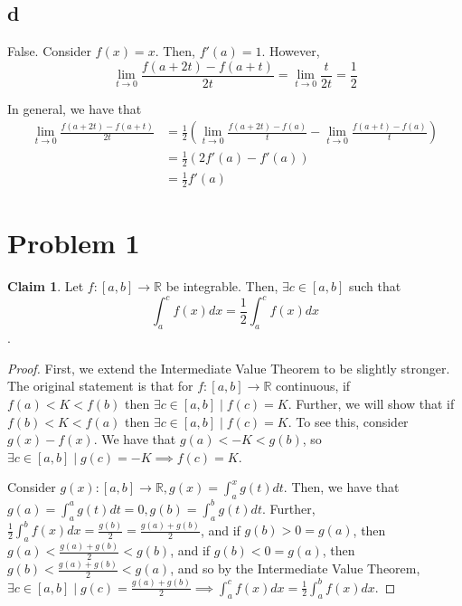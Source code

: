 \documentclass[12pt,letterpaper]{article}
\theoremstyle{definition}
\newtheorem*{claim}{Claim}
\newcommand{\R}{\mathbb{R}}
\begin{document}
\begin{proofof}
\subsection*{d}

False. Consider $f(x) = x$. Then, $f'(a) = 1$. However,
\[
  \lim_{t\rightarrow 0}\frac{f(a + 2t) - f(a+t)}{2t} = \lim_{t\rightarrow
    0}\frac{t}{2t} = \frac{1}{2}
\]

In general, we have that
\begin{align*}
  \lim_{t\rightarrow 0}\frac{f(a + 2t) - f(a+t)}{2t} &= \frac{1}{2}(\lim_{t\rightarrow 0}\frac{f(a + 2t) - f(a)}{t} - \lim_{t\rightarrow 0}\frac{f(a + t) - f(a)}{t}) \\
                                                     &= \frac{1}{2}(2f'(a) - f'(a)) \\
                                                     &= \frac{1}{2}f'(a)
\end{align*}

\section*{Problem 1}

\begin{claim}
  Let $f: [a,b] \rightarrow \R$ be integrable. Then, $\exists c \in [a,b]$ such
  that
  \[
    \int_a^cf(x)dx = \frac{1}{2}\int_a^cf(x)dx
  \].
\end{claim}

\begin{proof}

  First, we extend the Intermediate Value Theorem to be slightly stronger. The
  original statement is that for
  $f: [a,b] \rightarrow \R$ continuous, if $f(a) < K < f(b)$ then $\exists c \in
  [a,b] \mid f(c) = K$. Further, we will show that if $f(b) < K < f(a)$ then
  $\exists c \in [a,b] \mid f(c) = K$. To see this, consider $g(x) -f(x)$. We
  have that $g(a) < -K < g(b)$, so $\exists c \in [a,b] \mid g(c) = -K \implies
  f(c) = K$.
  
  Consider $g(x) : [a,b] \rightarrow \R, g(x) = \int_a^xg(t)dt$. Then, we have
  that $g(a) = \int_a^ag(t)dt = 0, g(b) = \int_a^bg(t)dt$. Further, $\frac{1}{2}
  \int_a^bf(x)dx = \frac{g(b)}{2} = \frac{g(a) + g(b)}{2}$, and if $g(b) > 0 = g(a)$, then $g(a) <
  \frac{g(a) + g(b)}{2} < g(b)$, and if $g(b) < 0 = g(a)$, then $g(b) <
  \frac{g(a) + g(b)}{2} < g(a)$, and so by the Intermediate Value Theorem,
  $\exists c \in [a,b] \mid g(c) = \frac{g(a) + g(b)}{2} \implies \int_a^cf(x)dx
    = \frac{1}{2}\int_a^bf(x)dx$.
\end{proof}


\end{proofof}
\end{document}
